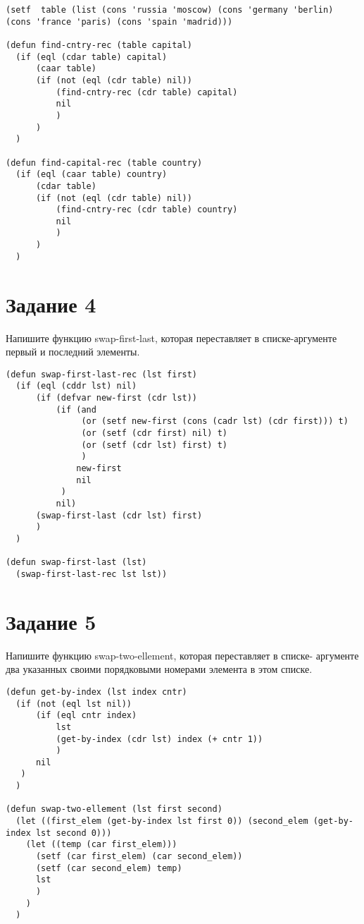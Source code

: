 \begin{lstlisting}
(setf  table (list (cons 'russia 'moscow) (cons 'germany 'berlin) (cons 'france 'paris) (cons 'spain 'madrid)))

(defun find-cntry-rec (table capital)
  (if (eql (cdar table) capital)
      (caar table)
      (if (not (eql (cdr table) nil))
          (find-cntry-rec (cdr table) capital)
          nil
          )
      )
  )

(defun find-capital-rec (table country)
  (if (eql (caar table) country)
      (cdar table)
      (if (not (eql (cdr table) nil))
          (find-cntry-rec (cdr table) country)
          nil
          )
      )
  )
\end{lstlisting}


\section{Задание 4}
Напишите функцию swap-first-last, которая переставляет в списке-аргументе первый и последний элементы.

\begin{lstlisting}
(defun swap-first-last-rec (lst first)
  (if (eql (cddr lst) nil)
      (if (defvar new-first (cdr lst))
          (if (and
               (or (setf new-first (cons (cadr lst) (cdr first))) t)
               (or (setf (cdr first) nil) t)
               (or (setf (cdr lst) first) t)
               )
              new-first
              nil
           )
          nil)
      (swap-first-last (cdr lst) first)
      )
  )

(defun swap-first-last (lst)
  (swap-first-last-rec lst lst))
\end{lstlisting}


\section{Задание 5}
Напишите функцию swap-two-ellement, которая переставляет в списке- аргументе два указанных своими порядковыми номерами элемента в этом списке.

\begin{lstlisting}
(defun get-by-index (lst index cntr)
  (if (not (eql lst nil))
      (if (eql cntr index)
          lst
          (get-by-index (cdr lst) index (+ cntr 1))
          )
      nil
   )
  )

(defun swap-two-ellement (lst first second)
  (let ((first_elem (get-by-index lst first 0)) (second_elem (get-by-index lst second 0)))
    (let ((temp (car first_elem)))
      (setf (car first_elem) (car second_elem))
      (setf (car second_elem) temp)
      lst
      )
    )
  )
\end{lstlisting}

